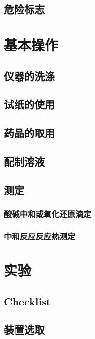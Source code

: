 \documentclass[a4paper]{article}
\begin{document}
	\subsection{危险标志}
	
	
	\clearpage
	\section{基本操作}
	
	
	\subsection{仪器的洗涤}
	
	
	\subsection{试纸的使用}
	
	
	\subsection{药品的取用}
	
	
	\subsection{配制溶液}
	
	
	\subsection{测定}
	
	\subsubsection{酸碱中和或氧化还原滴定}
	
	\subsubsection{中和反应反应热测定}
	
	
	\clearpage
	\section{实验}
	
	
	\subsection{Checklist}
	
	
	\subsection{装置选取}
	
\end{document}
